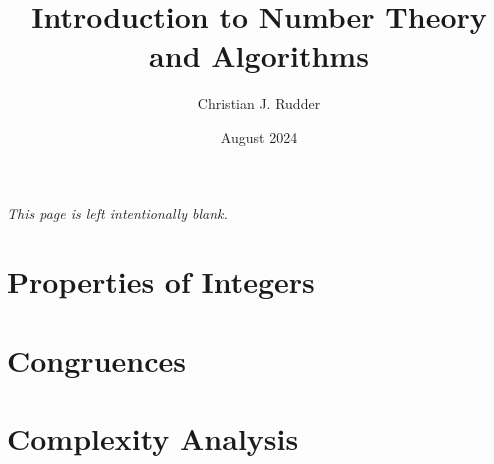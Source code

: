 \documentclass{memoir}
\title{Introduction to Number Theory and Algorithms}
\author{Christian J. Rudder}
\date{August 2024}
\begin{document}
\maketitle
\setcounter{tocdepth}{2}

\tableofcontents

\newpage
\thispagestyle{empty}
\mbox{}
\vfill
\begin{center}
    \textit{This page is left intentionally blank.}
\end{center}
\vfill
\newpage




\chapter{Properties of Integers}





\chapter{Congruences}








\chapter{Complexity Analysis}




\end{document}
